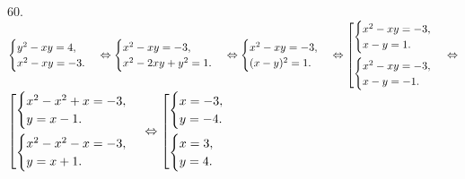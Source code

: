 60. $\begin{cases}
y^2-xy=4,\\
x^2-xy=-3.\end{cases}\Leftrightarrow\begin{cases}
x^2-xy=-3,\\
x^2-2xy+y^2=1.\end{cases}\Leftrightarrow\begin{cases}
x^2-xy=-3,\\
(x-y)^2=1.\end{cases}\Leftrightarrow\left[
      \begin{gathered} \begin{cases}x^2-xy=-3,\\ x-y=1.\end{cases}\hfill\\
      \begin{cases}x^2-xy=-3,\\ x-y=-1.\end{cases}\hfill \end{gathered}\right.
\Leftrightarrow$\\$\left[
      \begin{gathered} \begin{cases}x^2-x^2+x=-3,\\ y=x-1.\end{cases}\hfill\\
      \begin{cases}x^2-x^2-x=-3,\\ y=x+1.\end{cases}\hfill \end{gathered}\right.
\Leftrightarrow\left[
      \begin{gathered} \begin{cases}x=-3,\\ y=-4.\end{cases}\hfill\\
      \begin{cases}x=3,\\ y=4.\end{cases}\hfill \end{gathered}\right.$\\
